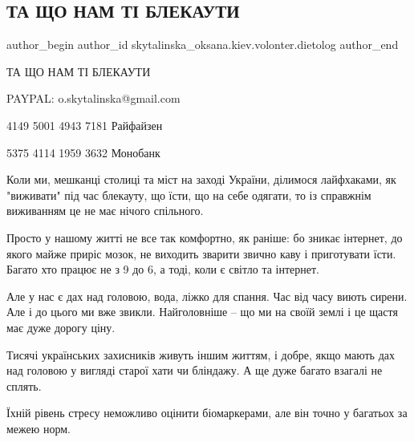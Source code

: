  
 
 
 
 
 
\subsection{ТА ЩО НАМ ТІ БЛЕКАУТИ}
\label{sec:08_11_2022.fb.skytalinska_oksana.kiev.volonter.dietolog.1.blekauty}
 
\ifcmt
 author_begin
   author_id skytalinska_oksana.kiev.volonter.dietolog
 author_end
\fi

ТА ЩО НАМ ТІ БЛЕКАУТИ

PAYPAL: o.skytalinska@gmail.com

4149 5001 4943 7181 Райфайзен

5375 4114 1959 3632 Монобанк

Коли ми, мешканці столиці та міст на заході України, ділимося лайфхаками, як
"виживати" під час блекауту, що їсти, що на себе одягати,  то із справжнім
виживанням це не має нічого спільного. 

Просто у нашому житті не все так комфортно, як раніше: бо зникає інтернет, до
якого майже приріс мозок, не виходить зварити звично каву і приготувати їсти.
Багато хто працює не з 9 до 6, а тоді, коли є світло та інтернет.

Але у нас є дах над головою, вода, ліжко для спання. Час від часу виють сирени.
Але і до цього ми вже звикли. Найголовніше -- що ми на своїй землі і це щастя
має дуже дорогу ціну.


Тисячі українських захисників живуть іншим життям, і добре, якщо мають дах над
головою у вигляді старої хати чи бліндажу. А ще дуже багато взагалі не сплять. 

Їхній рівень стресу неможливо оцінити біомаркерами, але він точно у багатьох за
межею норм.

